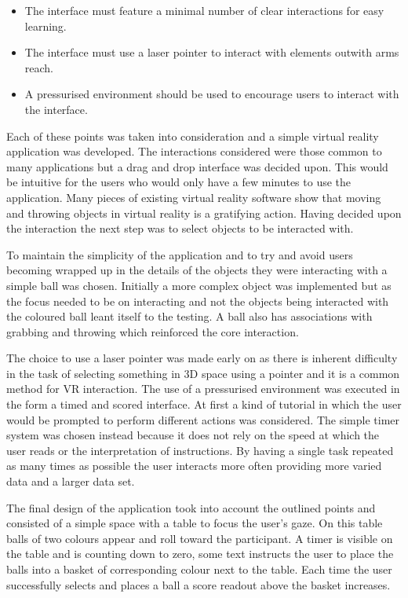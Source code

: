 \documentclass[12pt]{article}
\begin{document}
\begin{itemize}[noitemsep,topsep=0pt]
\item The interface must feature a minimal number of clear interactions for easy learning.
\item The interface must use a laser pointer to interact with elements outwith arms reach.
\item A pressurised environment should be used to encourage users to interact with the interface.
\end{itemize}

Each of these points was taken into consideration and a simple virtual reality application was developed. The interactions considered were those common to many applications but a drag and drop interface was decided upon. This would be intuitive for the users who would only have a few minutes to use the application. Many pieces of existing virtual reality software  show that moving and throwing objects in virtual reality is a gratifying action. Having decided upon the interaction the next step was to select objects to be interacted with.

To maintain the simplicity of the application and to try and avoid users becoming wrapped up in the details of the objects they were interacting with a simple ball was chosen. Initially a more complex object was implemented but as the focus needed to be on interacting and not the objects being interacted with the coloured ball leant itself to the testing. A ball also has associations with grabbing and throwing which reinforced the core interaction.

The choice to use a laser pointer was made early on as there is inherent difficulty in the task of selecting something in 3D space using a pointer and it is a common method for VR interaction. The use of a pressurised environment was executed in the form a timed and scored interface. At first a kind of tutorial in which the user would be prompted to perform different actions was considered. The simple timer system was chosen instead because it does not rely on the speed at which the user reads or the interpretation of instructions. By having a single task repeated as many times as possible the user interacts more often providing more varied data and a larger data set.

The final design of the application took into account the outlined points and consisted of a simple space with a table to focus the user's gaze. On this table balls of two colours appear and roll toward the participant. A timer is visible on the table and is counting down to zero, some text instructs the user to place the balls into a basket of corresponding colour next to the table. Each time the user successfully selects and places a ball a score readout above the basket increases.
\end{document}
